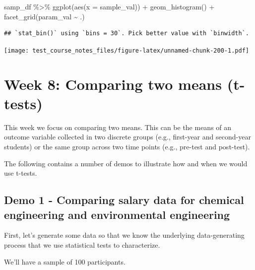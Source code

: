 \documentclass[
]{book}
\newenvironment{Shaded}{\begin{snugshade}}{\end{snugshade}}
\newcommand{\AttributeTok}[1]{\textcolor[rgb]{0.77,0.63,0.00}{#1}}
\newcommand{\FunctionTok}[1]{\textcolor[rgb]{0.00,0.00,0.00}{#1}}
\newcommand{\NormalTok}[1]{#1}
\newcommand{\SpecialCharTok}[1]{\textcolor[rgb]{0.00,0.00,0.00}{#1}}
\begin{document}
\begin{Shaded}
\begin{Highlighting}[]
\NormalTok{samp\_df }\SpecialCharTok{\%\textgreater{}\%}
  \FunctionTok{ggplot}\NormalTok{(}\FunctionTok{aes}\NormalTok{(}\AttributeTok{x =}\NormalTok{ sample\_val)) }\SpecialCharTok{+}
  \FunctionTok{geom\_histogram}\NormalTok{() }\SpecialCharTok{+}
  \FunctionTok{facet\_grid}\NormalTok{(param\_val }\SpecialCharTok{\textasciitilde{}}\NormalTok{ .)}
\end{Highlighting}
\end{Shaded}

\begin{verbatim}
## `stat_bin()` using `bins = 30`. Pick better value with `binwidth`.
\end{verbatim}

\texttt{[image: test\_course\_notes\_files/figure-latex/unnamed-chunk-200-1.pdf]}

\hypertarget{week-8-comparing-two-means-t-tests}{%
\chapter{Week 8: Comparing two means (t-tests)}\label{week-8-comparing-two-means-t-tests}}

This week we focus on comparing two means. This can be the means of an outcome variable collected in two discrete groups (e.g., first-year and second-year students) or the same group across two time points (e.g., pre-test and post-test).

The following contains a number of demos to illustrate how and when we would use t-tests.

\hypertarget{demo-1---comparing-salary-data-for-chemical-engineering-and-environmental-engineering}{%
\section{Demo 1 - Comparing salary data for chemical engineering and environmental engineering}\label{demo-1---comparing-salary-data-for-chemical-engineering-and-environmental-engineering}}

First, let's generate some data so that we know the underlying data-generating process that we use statistical tests to characterize.

We'll have a sample of 100 participants.
\end{document}
